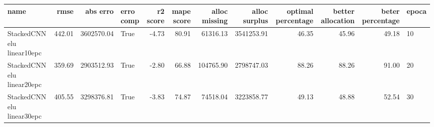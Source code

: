\begin{tabular}{lrrlrrrrrrrl}
\toprule
name & rmse & abs erro & erro comp & r2 score & mape score & alloc missing & alloc surplus & optimal percentage & better allocation & beter percentage & epoca \\
\midrule
StackedCNN elu linear10epc & 442.01 & 3602570.04 & True & -4.73 & 80.91 & 61316.13 & 3541253.91 & 46.35 & 45.96 & 49.18 & 10 \\
StackedCNN elu linear20epc & 359.69 & 2903512.93 & True & -2.80 & 66.88 & 104765.90 & 2798747.03 & 88.26 & 88.26 & 91.00 & 20 \\
StackedCNN elu linear30epc & 405.55 & 3298376.81 & True & -3.83 & 74.87 & 74518.04 & 3223858.77 & 49.13 & 48.88 & 52.54 & 30 \\
\bottomrule
\end{tabular}
